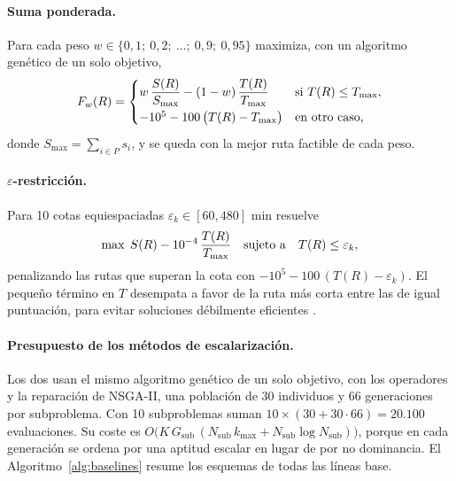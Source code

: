 \paragraph{Suma ponderada.} Para cada peso $w \in \{0{,}1;\ 0{,}2;\ \dots;\ 0{,}9;\ 0{,}95\}$ maximiza, con un algoritmo genético de un solo objetivo,
\begin{equation}
  F_{w}(R) =
  \begin{cases}
    w\, \dfrac{S(R)}{S_{\max}} - (1-w)\, \dfrac{T(R)}{T_{\max}} & \text{si } T(R) \le T_{\max},\\[6pt]
    -10^5 - 100\,\bigl(T(R) - T_{\max}\bigr) & \text{en otro caso,}
  \end{cases}
\end{equation}
donde $S_{\max} = \sum_{i \in P} s_i$, y se queda con la mejor ruta factible de cada peso.

\paragraph{$\varepsilon$-restricción.} Para 10 cotas equiespaciadas $\varepsilon_k \in [60, 480]$ min resuelve
\begin{equation}
  \max\; S(R) - 10^{-4}\, \frac{T(R)}{T_{\max}} \quad \text{sujeto a} \quad T(R) \le \varepsilon_k,
\end{equation}
penalizando las rutas que superan la cota con $-10^5 - 100\,(T(R) - \varepsilon_k)$. El pequeño término en $T$ desempata a favor de la ruta más corta entre las de igual puntuación, para evitar soluciones débilmente eficientes \citep{mavrotas2009}.

\paragraph{Presupuesto de los métodos de escalarización.} Los dos usan el mismo algoritmo genético de un solo objetivo, con los operadores y la reparación de NSGA-II, una población de 30 individuos y 66 generaciones por subproblema. Con 10 subproblemas suman $10 \times (30 + 30 \cdot 66) = 20.100$ evaluaciones. Su coste es $O\bigl(K\,G_{\mathrm{sub}}\,(N_{\mathrm{sub}}\,k_{\max} + N_{\mathrm{sub}} \log N_{\mathrm{sub}})\bigr)$, porque en cada generación se ordena por una aptitud escalar en lugar de por no dominancia. El Algoritmo~\ref{alg:baselines} resume los esquemas de todas las líneas base.

